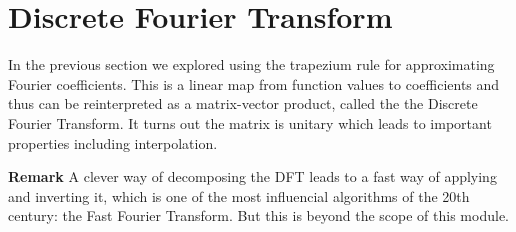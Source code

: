 
\section{Discrete Fourier Transform}
In the previous section we explored using the trapezium rule for approximating Fourier coefficients. This is a linear map from function values to coefficients and thus can be reinterpreted as a matrix-vector product, called the the Discrete Fourier Transform. It turns out the matrix is unitary which leads to important properties including interpolation. 

\textbf{Remark} A clever way of decomposing the DFT leads to a fast way of applying and inverting it, which is one of the most influencial algorithms of the 20th century: the Fast Fourier Transform. But this is beyond the scope of this module.


